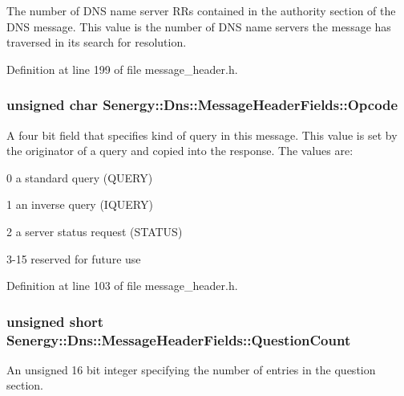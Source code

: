 The number of D\-N\-S name server R\-Rs contained in the authority section of the D\-N\-S message. This value is the number of D\-N\-S name servers the message has traversed in its search for resolution. 



Definition at line 199 of file message\-\_\-header.\-h.

\hypertarget{struct_senergy_1_1_dns_1_1_message_header_fields_ac2d7ba4468405e5693f07d4321058be0}{
\subsubsection[{Opcode}]{\setlength{\rightskip}{0pt plus 5cm}unsigned char Senergy\-::\-Dns\-::\-Message\-Header\-Fields\-::\-Opcode}}\label{struct_senergy_1_1_dns_1_1_message_header_fields_ac2d7ba4468405e5693f07d4321058be0}


A four bit field that specifies kind of query in this message. This value is set by the originator of a query and copied into the response. The values are\-: 

0 a standard query (Q\-U\-E\-R\-Y)

1 an inverse query (I\-Q\-U\-E\-R\-Y)

2 a server status request (S\-T\-A\-T\-U\-S)

3-\/15 reserved for future use 

Definition at line 103 of file message\-\_\-header.\-h.

\hypertarget{struct_senergy_1_1_dns_1_1_message_header_fields_a8af9bbfa134c9e0d4fc846103f7b72ad}{
\subsubsection[{Question\-Count}]{\setlength{\rightskip}{0pt plus 5cm}unsigned short Senergy\-::\-Dns\-::\-Message\-Header\-Fields\-::\-Question\-Count}}\label{struct_senergy_1_1_dns_1_1_message_header_fields_a8af9bbfa134c9e0d4fc846103f7b72ad}


An unsigned 16 bit integer specifying the number of entries in the question section. 




